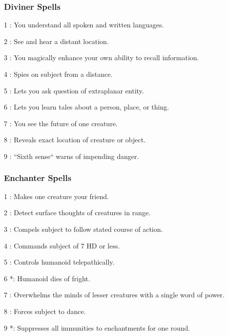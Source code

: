 \subsubsection{Diviner Spells}
\begin{list}{}{\leftmargin=1em}
\item[1] : You understand all spoken and written languages.
\item[2] : See and hear a distant location.
\item[3] : You magically enhance your own ability to recall information.
\item[4] : Spies on subject from a distance.
\item[5] : Lets you ask question of extraplanar entity.
\item[6] : Lets you learn tales about a person, place, or thing.
\item[7] : You see the future of one creature.
\item[8] : Reveals exact location of creature or object.
\item[9] : ``Sixth sense`` warns of impending danger.
\end{list}
\subsubsection{Enchanter Spells}
\begin{list}{}{\leftmargin=1em}
\item[1] : Makes one creature your friend.
\item[2] : Detect surface thoughts of creatures in range.
\item[3] : Compels subject to follow stated course of action.
\item[4] : Commands subject of 7 HD or less.
\item[5] : Controls humanoid telepathically.
\item[6] *: Humanoid dies of fright.
\item[7] : Overwhelms the minds of lesser creatures with a single word of power.
\item[8] : Forces subject to dance.
\item[9] *: Suppresses all immunities to enchantments for one round.
\end{list}
